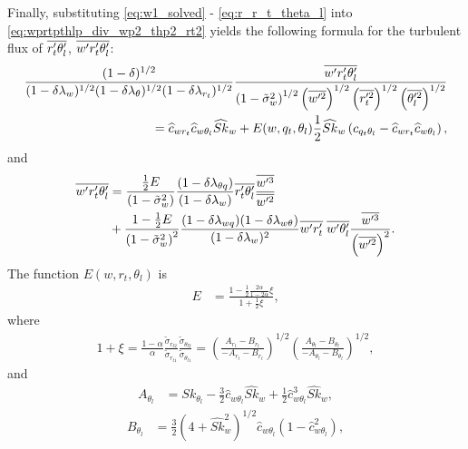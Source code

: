 Finally, substituting \cref{eq:w1_solved} - \cref{eq:r_r_t_theta_l} into \cref{eq:wprtpthlp_div_wp2_thp2_rt2}
yields the following formula for the turbulent flux of $\overline{r_t' \theta_l'}$, $\overline{w' r_t' \theta_l'}$:
\begin{align}
    \label{eq:wprtpthlp_div_wp2_thp2_rt2_sk_w}
    \frac{(1-\delta)^{1/2}}{(1-\delta \lambda_w)^{1/2}
        (1-\delta \lambda_\theta)^{1/2}
        (1-\delta \lambda_{r_t})^{1/2}}
    \frac{\overline{w' r_t' \theta_l'}}{\left( 1 - \tilde{\sigma}_w^2 \right)^{1/2}
        \left( \overline{w'^2} \right)^{1/2}
        \left(\overline{r_t'^2}\right)^{1/2} \left(\overline{\theta_l'^2}\right)^{1/2}} \nonumber \\
    = \widehat{c}_{wr_t} \widehat{c}_{w\theta_l} \widehat{Sk}_w
    + E(w,q_t,\theta_l) \frac{1}{2} \widehat{Sk}_w
    \left( c_{q_t\theta_l} - \widehat{c}_{wr_t} \widehat{c}_{w\theta_l}\right),
\end{align}
and
\begin{align}
    \label{eq:wprtpthlp_E}
    \overline{w' r_t' \theta_l'}
    &= \frac{\frac{1}{2} E}{\left( 1 - \tilde{\sigma}_w^2 \right)}
    \frac{(1-\delta \lambda_{\theta q})} {(1 - \delta \lambda_w)}
    \overline{r_t' \theta_l'} \frac{\overline{w'^3}}{\overline{w'^2}} \nonumber\\
    &+ \frac{1 - \frac{1}{2} E}{\left( 1 - \tilde{\sigma}_w^2 \right)^2}
    \frac{(1-\delta \lambda_{w q})(1-\delta \lambda_{w \theta})}{(1 - \delta \lambda_w)^2}
    \overline{w' r_t'} \; \overline{w' \theta_l'} \frac{\overline{w'^3}}{\left( \overline{w'^2} \right)^2}.
\end{align}
The function $E(w,r_t,\theta_l)$ is
\begin{align}
    \label{eq:E}
    E &= \frac{1 - \frac{1}{2} \frac{2\alpha}{1-2\alpha} \xi}{1 + \frac{1}{2} \xi},
\end{align}
where
\begin{align}
    1 + \xi
    = \frac{1-\alpha}{\alpha} \frac{\tilde{\sigma}_{r_{t2}}}{\tilde{\sigma}_{r_{t1}}} \frac{ \tilde{\sigma}_{\theta_{l2}}}{\tilde{\sigma}_{\theta_{l1}}}
    = \left(\frac{A_{r_t} - B_{r_t}}{-A_{r_t} - B_{r_t}}\right)^{1/2} \left(\frac{A_{\theta_l} - B_{\theta_l}}{-A_{\theta_l} - B_{\theta_l}}\right)^{1/2},
\end{align}
and
\begin{align}
    \label{eq:A_thl}
    A_{\theta_l}
    &= Sk_{\theta_l} - \frac{3}{2} \widehat{c}_{w\theta_l} \widehat{Sk}_w + \frac{1}{2} \widehat{c}_{w\theta_l}^3 \widehat{Sk}_w,
\end{align}
\begin{align}
    B_{\theta_l}
    &= \frac{3}{2} \left(4 + \widehat{Sk}_w^2 \right)^{1/2} \widehat{c}_{w\theta_l} \left(1 - \widehat{c}_{w\theta_l}^2\right),
\end{align}
